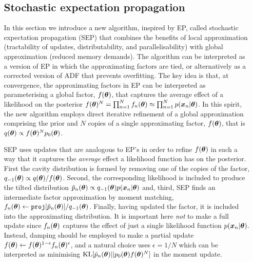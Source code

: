\subsection{Stochastic expectation propagation}
%
In this section we introduce a new algorithm, inspired by EP, called stochastic expectation propagation (SEP) that combines the benefits of local approximation (tractability of updates, distributability, and parallelisability) with global approximation (reduced memory demands).  The algorithm can be interpreted as a version of EP in which the approximating factors are tied, or alternatively as a corrected version of ADF that prevents overfitting. 
%
The key idea is that, at convergence, the approximating factors in EP can be interpreted as parameterising a global factor,  $f(\bm{\theta})$, that captures the average effect of a likelihood on the posterior  $f(\bm{\theta})^{N} = \prod_{n=1}^{N} f_n(\bm{\theta}) \approx \prod_{n=1}^{N} p(\bm{x}_n | \bm{\theta})$. In this spirit, the new algorithm employs direct iterative refinement of a global approximation comprising the prior and $N$ copies of a single approximating factor, $f(\bm{\theta})$, that is $q(\bm{\theta}) \propto f(\bm{\theta})^N p_0(\bm{\theta})$.

SEP uses updates that are analogous to EP's in order to refine $f(\bm{\theta})$ in such a way that it captures the \emph{average} effect a likelihood function has on the posterior. First the cavity distribution is formed by removing one of the copies of the factor, $q_{-1}(\bm{\theta}) \propto q(\bm{\theta})/f(\bm{\theta})$. 
Second, the corresponding likelihood is included to produce the tilted distribution $\tilde{p}_n(\bm{\theta}) \propto q_{-1}(\bm{\theta}) p(\bm{x}_n | \bm{\theta})$ and, third, SEP finds an intermediate factor approximation by moment matching, $f_n(\bm{\theta}) \leftarrow \mathtt{proj}[\tilde{p}_n(\bm{\theta})] / q_{-1}(\bm{\theta}) $. Finally, having updated the factor, it is included into the approximating distribution. It is important here \emph{not} to make a full update since $f_n(\bm{\theta})$ captures the effect of just a single likelihood function  $p(\bm{x}_n | \bm{\theta})$. Instead, damping should be employed to make a partial update $f(\bm{\theta}) \leftarrow f(\bm{\theta})^{1 - \epsilon} f_n(\bm{\theta})^{\epsilon}$, and a natural choice uses $\epsilon = 1/N$ which can be interpreted as minimising  $\mathrm{KL}[\tilde{p}_n(\bm{\theta}) || p_{0}(\bm{\theta})  f(\bm{\theta})^N]$ in the moment update.

